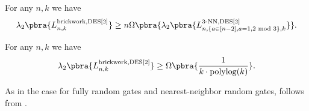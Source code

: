 \begin{lemma}\label{lem:local to brickwork}
    For any $n,k$ we have
    \begin{align*}
        \lambda_2\pbra{L_{n,k}^{\mathrm{brickwork},\des{2}}}\geq  n\Omega\pbra{\lambda_2\pbra{L_{n,\{a\in[n-2],a=1,2\text{ mod } 3\},k}^{3\text{-NN},\des{2}}}}.
    \end{align*}
\end{lemma}

\begin{corollary}\label{cor:initial spectral gap brickwork}
    For any $n,k$ we have
    \begin{align*}
        \lambda_2\pbra{L_{n,k}^{\mathrm{brickwork},\des{2}}}\geq  \Omega\pbra{\frac1{k\cdot\polylog(k)}}.
    \end{align*}
\end{corollary}

As in the case for fully random gates and nearest-neighbor random gates,  follows from .


